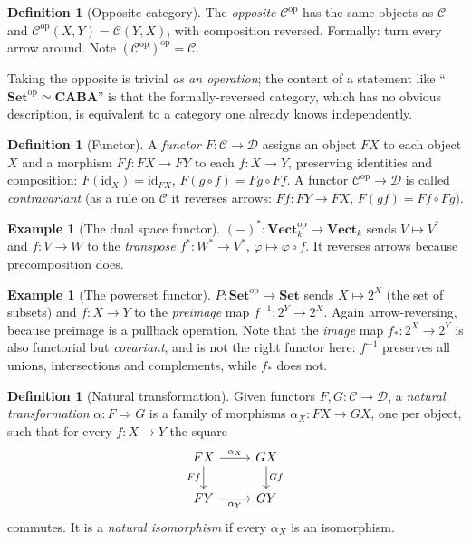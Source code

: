 \documentclass[11pt,a4paper]{article}
\theoremstyle{definition}
\newtheorem{definition}[theorem]{Definition}
\newtheorem{example}[theorem]{Example}
\theoremstyle{remark}
\newcommand{\dual}[1]{#1^{*}}
\newcommand{\cat}[1]{\mathbf{#1}}
\newcommand{\Set}{\cat{Set}}
\newcommand{\CABA}{\cat{CABA}}
\newcommand{\Vect}{\cat{Vect}}
\newcommand{\op}{\mathrm{op}}
\begin{document}
\begin{definition}[Opposite category]\label{def:op}
The \emph{opposite} $\mathcal{C}^{\op}$ has the same objects as $\mathcal{C}$ and
$\mathcal{C}^{\op}(X,Y) = \mathcal{C}(Y,X)$, with composition reversed. Formally: turn every
arrow around. Note $(\mathcal{C}^{\op})^{\op} = \mathcal{C}$.
\end{definition}

Taking the opposite is trivial \emph{as an operation}; the content of a statement like
``$\Set^{\op} \simeq \CABA$'' is that the formally-reversed category, which has no obvious
description, is equivalent to a category one already knows independently.

\begin{definition}[Functor]
A \emph{functor} $F : \mathcal{C} \to \mathcal{D}$ assigns an object $FX$ to each object $X$
and a morphism $Ff : FX \to FY$ to each $f : X \to Y$, preserving identities and composition:
$F(\mathrm{id}_X) = \mathrm{id}_{FX}$, $F(g \circ f) = Fg \circ Ff$. A functor
$\mathcal{C}^{\op} \to \mathcal{D}$ is called \emph{contravariant} (as a rule on
$\mathcal{C}$ it reverses arrows: $Ff : FY \to FX$, $F(gf) = Ff \circ Fg$).
\end{definition}

\begin{example}[The dual space functor]
$(-)^{*} : \Vect_k^{\op} \to \Vect_k$ sends $V \mapsto \dual{V}$ and $f : V \to W$ to the
\emph{transpose} $\dual{f} : \dual{W} \to \dual{V}$, $\varphi \mapsto \varphi \circ f$. It
reverses arrows because precomposition does.
\end{example}

\begin{example}[The powerset functor]\label{ex:powerset}
$P : \Set^{\op} \to \Set$ sends $X \mapsto 2^{X}$ (the set of subsets) and
$f : X \to Y$ to the \emph{preimage} map $f^{-1} : 2^{Y} \to 2^{X}$. Again arrow-reversing,
because preimage is a pullback operation. Note that the \emph{image} map $f_{*} : 2^X \to 2^Y$
is also functorial but \emph{covariant}, and is not the right functor here: $f^{-1}$ preserves
all unions, intersections and complements, while $f_*$ does not.
\end{example}

\begin{definition}[Natural transformation]
Given functors $F, G : \mathcal{C} \to \mathcal{D}$, a \emph{natural transformation}
$\alpha : F \Rightarrow G$ is a family of morphisms $\alpha_X : FX \to GX$, one per object,
such that for every $f : X \to Y$ the square
\[
\begin{tikzcd}
FX \arrow[r,"\alpha_X"] \arrow[d,"Ff"'] & GX \arrow[d,"Gf"] \\
FY \arrow[r,"\alpha_Y"'] & GY
\end{tikzcd}
\]
commutes. It is a \emph{natural isomorphism} if every $\alpha_X$ is an isomorphism.
\end{definition}
\end{document}
